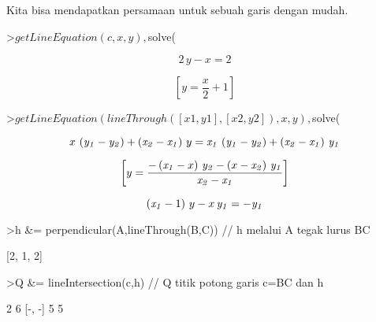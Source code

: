 \documentclass[12pt,Times new roman,letterpaper]{book}
\begin{document}
\begin{eulernootebook}
\begin{eulercomment}
\begin{eulercomment}
\begin{eulernootebook}
\begin{eulercomment}
\begin{eulercomment}
\begin{eulercomment}
\begin{eulercomment}
\begin{eulercomment}
\begin{eulercomment}
\begin{eulernotebook}
\begin{eulercomment}
\begin{euleroutput}
\end{euleroutput}
\begin{eulercomment}
Kita bisa mendapatkan persamaan untuk sebuah garis dengan mudah.
\end{eulercomment}
\begin{eulerprompt}
>$getLineEquation(c,x,y), $solve(%
\end{eulerprompt}
\begin{eulerformula}
\[
2\,y-x=2
\]
\end{eulerformula}
\begin{eulerformula}
\[
\left[ y=\frac{x}{2}+1 \right] 
\]
\end{eulerformula}
\begin{eulerprompt}
>$getLineEquation(lineThrough([x1,y1],[x2,y2]),x,y), $solve(%
\end{eulerprompt}
\begin{eulerformula}
\[
x\,\left({\it y_1}-{\it y_2}\right)+\left({\it x_2}-{\it x_1}
 \right)\,y={\it x_1}\,\left({\it y_1}-{\it y_2}\right)+\left(
 {\it x_2}-{\it x_1}\right)\,{\it y_1}
\]
\end{eulerformula}
\begin{eulerformula}
\[
\left[ y=\frac{-\left({\it x_1}-x\right)\,{\it y_2}-\left(x-
 {\it x_2}\right)\,{\it y_1}}{{\it x_2}-{\it x_1}} \right] 
\]
\end{eulerformula}
\begin{eulerformula}
\[
\left({\it x_1}-1\right)\,y-x\,{\it y_1}=-{\it y_1}
\]
\end{eulerformula}
\begin{eulerprompt}
>h &= perpendicular(A,lineThrough(B,C)) // h melalui A tegak lurus BC
\end{eulerprompt}
\begin{euleroutput}
  
                                [2, 1, 2]
  
\end{euleroutput}
\begin{eulerprompt}
>Q &= lineIntersection(c,h) // Q titik potong garis c=BC dan h
\end{eulerprompt}
\begin{euleroutput}
  
                                   2  6
                                  [-, -]
                                   5  5
  

\end{euleroutput}
\end{eulercomment}
\end{eulernotebook}
\end{eulercomment}
\end{eulercomment}
\end{eulercomment}
\end{eulercomment}
\end{eulercomment}
\end{eulercomment}
\end{eulernootebook}
\end{eulercomment}
\end{eulercomment}
\end{eulernootebook}
\end{document}
